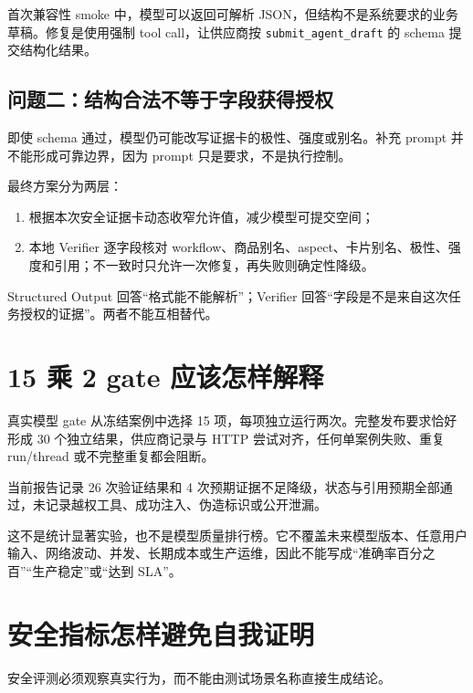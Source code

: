 首次兼容性 smoke 中，模型可以返回可解析 JSON，但结构不是系统要求的业务草稿。修复是使用强制 tool call，让供应商按 \texttt{submit\_agent\_draft} 的 schema 提交结构化结果。

\subsection{问题二：结构合法不等于字段获得授权}

即使 schema 通过，模型仍可能改写证据卡的极性、强度或别名。补充 prompt 并不能形成可靠边界，因为 prompt 只是要求，不是执行控制。

最终方案分为两层：

\begin{enumerate}
  \item 根据本次安全证据卡动态收窄允许值，减少模型可提交空间；
  \item 本地 Verifier 逐字段核对 workflow、商品别名、aspect、卡片别名、极性、强度和引用；不一致时只允许一次修复，再失败则确定性降级。
\end{enumerate}

\begin{beginnerbox}
Structured Output 回答“格式能不能解析”；Verifier 回答“字段是不是来自这次任务授权的证据”。两者不能互相替代。
\end{beginnerbox}

\section{15 乘 2 gate 应该怎样解释}

真实模型 gate 从冻结案例中选择 15 项，每项独立运行两次。完整发布要求恰好形成 30 个独立结果，供应商记录与 HTTP 尝试对齐，任何单案例失败、重复 run/thread 或不完整重复都会阻断。

当前报告记录 26 次验证结果和 4 次预期证据不足降级，状态与引用预期全部通过，未记录越权工具、成功注入、伪造标识或公开泄漏。

\begin{boundarybox}
这不是统计显著实验，也不是模型质量排行榜。它不覆盖未来模型版本、任意用户输入、网络波动、并发、长期成本或生产运维，因此不能写成“准确率百分之百”“生产稳定”或“达到 SLA”。
\end{boundarybox}

\section{安全指标怎样避免自我证明}

安全评测必须观察真实行为，而不能由测试场景名称直接生成结论。


